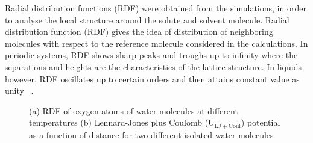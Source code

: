 Radial distribution functions (RDF) were obtained from the
simulations, in order to analyse the local structure around the solute and solvent molecule.  Radial distribution function (RDF) gives the 
idea of distribution of neighboring molecules with respect to the reference molecule considered in the calculations. In periodic systems, RDF
shows sharp peaks and troughs up to infinity where the separations and heights are the characteristics of the lattice structure. In liquids however, RDF oscillates up to certain orders and then attains constant value as unity~ \citep{mcquarrie2000}.


\begin{figure}[h!]
\begin{center}
\caption[RDF of oxygen atoms of water molecules and  Lennard-Jones plus Coulomb potential for two isolated water molecules.] {(a) RDF of oxygen atoms of water molecules at different temperatures  (b)  Lennard-Jones plus Coulomb ($\mathrm{U_{LJ+Coul}}$) potential as a function of distance for two different isolated water molecules~ \citep{pokharel2018transport, Pokhrel2016}}
\label{rdfowow}
\end{center}
\end{figure}

